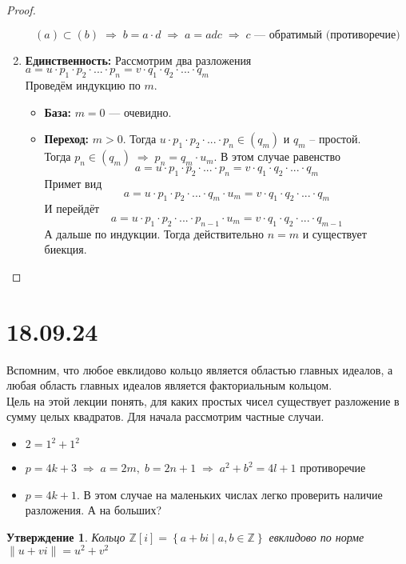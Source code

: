 \documentclass[12pt, a4paper]{article}
\newcommand{\ra}{\;\Rightarrow\;}
\newcommand{\Z}{\mathds{Z}}
\newcommand{\norm}[1]{\left \lVert #1 \right \rVert}
\theoremstyle{plain}
\newtheorem*{Statement*}{Утверждение}
\theoremstyle{definition}
\begin{document}
\begin{proof}
\begin{enumerate}
        \[(a)\subset(b)\ra b = a\cdot d\ra a=adc\ra c\text{ --- обратимый (противоречие)}\]
        \item \textbf{Единственность:} Рассмотрим два разложения $a = u\cdot p_1\cdot p_2\cdot ...\cdot p_n = v\cdot q_1\cdot q_2\cdot ...\cdot q_m$\\
            Проведём индукцию по $m$.
            \begin{itemize}
                \item \textbf{База:} $m=0$ --- очевидно.
                \item \textbf{Переход:} $m>0$. Тогда $u\cdot p_1\cdot p_2\cdot ... \cdot p_n\in (q_m)$ и $q_m$ -- простой.\\ Тогда $p_n\in (q_m) \ra p_n = q_m\cdot u_m$. В этом случае равенство
                \[a = u\cdot p_1\cdot p_2\cdot ...\cdot p_n = v\cdot q_1\cdot q_2\cdot ...\cdot q_m\]
                Примет вид
                \[a = u\cdot p_1\cdot p_2\cdot ...\cdot q_m\cdot u_m = v\cdot q_1\cdot q_2\cdot ...\cdot q_m\]
                И перейдёт 
                \[a = u\cdot p_1\cdot p_2\cdot ...\cdot p_{n-1}\cdot u_m = v\cdot q_1\cdot q_2\cdot ...\cdot q_{m-1}\]
                А дальше по индукции. Тогда действительно $n=m$  и существует биекция.
            \end{itemize}
    \end{enumerate}
\end{proof}
\section*{18.09.24}
\hypertarget{p5}{}
Вспомним, что любое евклидово кольцо является областью главных идеалов, а любая область главных идеалов является факториальным кольцом.\\
Цель на этой лекции понять, для каких простых чисел существует разложение в сумму целых квадратов. Для начала рассмотрим частные случаи.

\begin{itemize}
    \item $2 = 1^2+1^2$
    \item $p = 4k+3 \ra a = 2m,\; b = 2n+1 \ra a^2+b^2 = 4l+1$ противоречие
    \item $p = 4k+1$. В этом случае на маленьких числах легко проверить наличие разложения. А на больших?
\end{itemize}
\begin{Statement*}
    Кольцо $\Z[i] = \left\{a+bi\;|\;a,b\in\Z\right\}$ евклидово по норме $\norm{u+vi} = u^2+v^2$
\end{Statement*}
\end{document}
